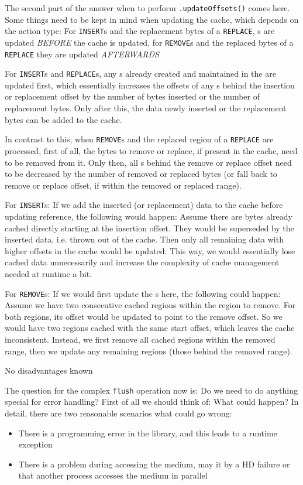 The second part of the answer when to perform \MediumReferenceRepository{}\texttt{.updateOffsets()} comes here. Some things need to be kept in mind when updating the cache, which depends on the action type:
{%
For \texttt{INSERT}s and the replacement bytes of a \texttt{REPLACE}, \IMediumReference{}s are updated \emph{BEFORE} the cache is updated, for \texttt{REMOVE}s and the replaced bytes of a \texttt{REPLACE} they are updated \emph{AFTERWARDS}
}
{%
For \texttt{INSERT}s and \texttt{REPLACE}s, any \IMediumReference{}s already created and maintained in the \MediumReferenceRepository{} are updated first, which essentially increases the offsets of any \IMediumReference{}s behind the insertion or replacement offset by the number of bytes inserted or the number of replacement bytes. Only after this, the data newly inserted or the replacement bytes can be added to the cache.

In contrast to this, when \texttt{REMOVE}s and the replaced region of a \texttt{REPLACE} are processed, first of all, the bytes to remove or replace, if present in the cache, need to be removed from it. Only then, all \IMediumReference{}s behind the remove or replace offset need to be decreased by the number of removed or replaced bytes (or fall back to remove or replace offset, if within the removed or replaced range). 
}
{%
For \texttt{INSERT}s: If we add the inserted (or replacement) data to the cache before updating reference, the following would happen: Assume there are bytes already cached directly starting at the insertion offset. They would be superseded by the inserted data, i.e. thrown out of the cache. Then only all remaining data with higher offsets in the cache would be updated. This way, we would essentially lose cached data unnecessarily and increase the complexity of cache management needed at runtime a bit.

For \texttt{REMOVE}s: If we would first update the \IMediumReference{}s here, the following could happen: Assume we have two consecutive cached regions within the region to remove. For both regions, its offset would be updated to point to the remove offset. So we would have two regions cached with the same start offset, which leaves the cache inconsistent. Instead, we first remove all cached regions within the removed range, then we update any remaining regions (those behind the removed range).
}
{%
No disadvantages known
}

The question for the complex \texttt{flush} operation now is: Do we need to do anything special for error handling? First of all we should think of: What could happen? In detail, there are two reasonable scenarios what could go wrong:
\begin{itemize}
\item There is a programming error in the library, and this leads to a runtime exception
\item There is a problem during accessing the medium, may it by a HD failure or that another process accesses the medium in parallel
\end{itemize}

